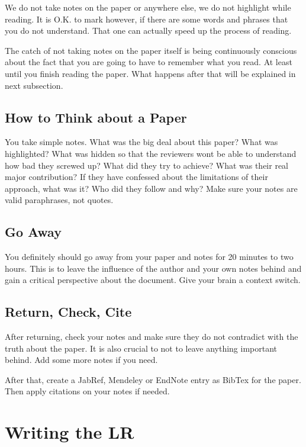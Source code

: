 \documentclass{article}
\begin{document}
We do not take notes on the paper or anywhere else, we do not highlight while reading. It is O.K. to mark however, if there are some words and phrases that you do not understand. That one can actually speed up the process of reading.

The catch of not taking notes on the paper itself is being continuously conscious about the fact that you are going to have to remember what you read. At least until you finish reading the paper. What happens after that will be explained in next subsection.

\subsection{How to Think about a Paper}

You take simple notes. What was the big deal about this paper? What was highlighted? What was hidden so that the reviewers wont be able to understand how bad they screwed up? What did they try to achieve? What was their real major contribution? If they have confessed about the limitations of their approach, what was it? Who did they follow and why? Make sure your notes are valid paraphrases, not quotes.

\subsection{Go Away}

You definitely should go away from your paper and notes for 20 minutes to two hours. This is to leave the influence of the author and your own notes behind and gain a critical perspective about the document. Give your brain a context switch.

\subsection{Return, Check, Cite}

After returning, check your notes and make sure they do not contradict with the truth about the paper. It is also crucial to not to leave anything important behind. Add some more notes if you need.

After that, create a JabRef, Mendeley or EndNote entry as BibTex for the paper. Then apply citations on your notes if needed.

\section{Writing the LR}
\end{document}
